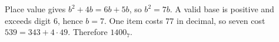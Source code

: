 Place value gives $b^2+4b=6b+5b$, so $b^2=7b$. A valid base is positive and exceeds digit $6$, hence $b=7$. One item costs $77$ in decimal, so seven cost $539=343+4\cdot49$. Therefore $\boxed{1400_7}$.
